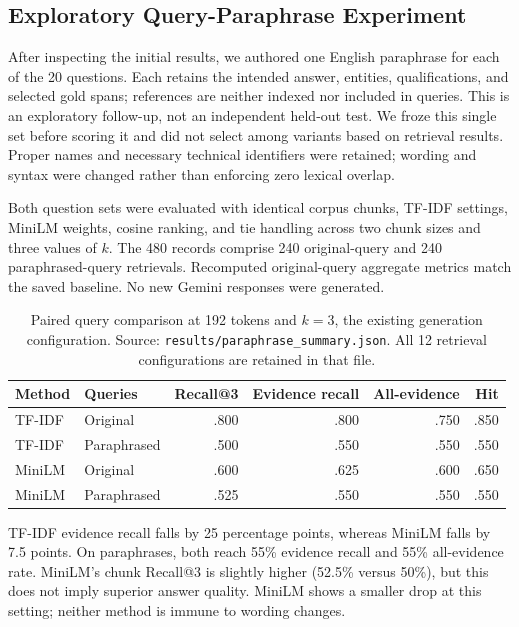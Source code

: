 \documentclass[12pt,a4paper]{article}
\begin{document}
\newpage
\subsection*{Exploratory Query-Paraphrase Experiment}
After inspecting the initial results, we authored one English paraphrase for each of the 20 questions. Each retains the intended answer, entities, qualifications, and selected gold spans; references are neither indexed nor included in queries. This is an exploratory follow-up, not an independent held-out test. We froze this single set before scoring it and did not select among variants based on retrieval results. Proper names and necessary technical identifiers were retained; wording and syntax were changed rather than enforcing zero lexical overlap.

Both question sets were evaluated with identical corpus chunks, TF-IDF settings, MiniLM weights, cosine ranking, and tie handling across two chunk sizes and three values of $k$. The 480 records comprise 240 original-query and 240 paraphrased-query retrievals. Recomputed original-query aggregate metrics match the saved baseline. No new Gemini responses were generated.

\begin{table}[H]\centering\small
\begin{tabular}{llrrrr}\toprule
Method & Queries & Recall@3 & Evidence recall & All-evidence & Hit\\\midrule
TF-IDF & Original & .800 & .800 & .750 & .850\\
TF-IDF & Paraphrased & .500 & .550 & .550 & .550\\
MiniLM & Original & .600 & .625 & .600 & .650\\
MiniLM & Paraphrased & .525 & .550 & .550 & .550\\\bottomrule
\end{tabular}
\caption{Paired query comparison at 192 tokens and $k=3$, the existing generation configuration. Source: \texttt{results/paraphrase\_summary.json}. All 12 retrieval configurations are retained in that file.}
\end{table}

TF-IDF evidence recall falls by 25 percentage points, whereas MiniLM falls by 7.5 points. On paraphrases, both reach 55\% evidence recall and 55\% all-evidence rate. MiniLM's chunk Recall@3 is slightly higher (52.5\% versus 50\%), but this does not imply superior answer quality. MiniLM shows a smaller drop at this setting; neither method is immune to wording changes.
\end{document}
